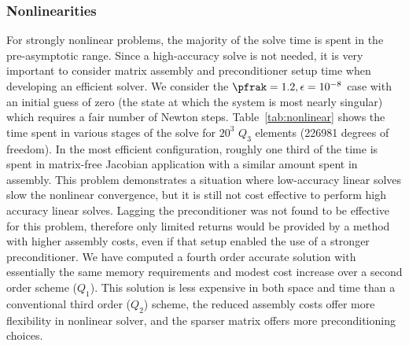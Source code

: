 \subsubsection{Nonlinearities}
For strongly nonlinear problems, the majority of the solve time is spent in the pre-asymptotic range.  Since a
high-accuracy solve is not needed, it is very important to consider matrix assembly and preconditioner setup time when
developing an efficient solver.  We consider the $\pfrak=1.2, \epsilon=10^{-8}$ case with an initial guess of zero (the
state at which the system is most nearly singular) which requires a fair number of Newton steps.
Table~\ref{tab:nonlinear} shows the time spent in various stages of the solve for $20^3$ $Q_3$ elements (226981 degrees
of freedom).  In the most efficient configuration, roughly one third of the time is spent in matrix-free Jacobian
application with a similar amount spent in assembly.  This problem demonstrates a situation where low-accuracy linear
solves slow the nonlinear convergence, but it is still not cost effective to perform high accuracy linear solves.
Lagging the preconditioner was not found to be effective for this problem, therefore only limited returns would be
provided by a method with higher assembly costs, even if that setup enabled the use of a stronger preconditioner.  We
have computed a fourth order accurate solution with essentially the same memory requirements and modest cost increase
over a second order scheme ($Q_1$).  This solution is less expensive in both space and time than a conventional third
order ($Q_2$) scheme, the reduced assembly costs offer more flexibility in nonlinear solver, and the sparser matrix
offers more preconditioning choices.

